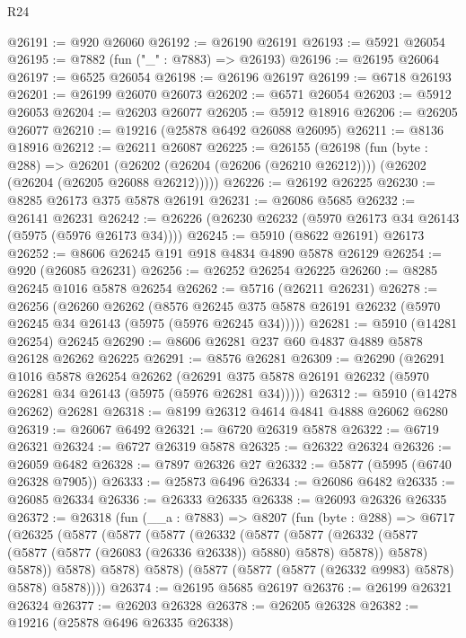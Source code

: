 \begin{lexlean}{R24}
\begin{coremodule}
@26191 := @920 @26060
@26192 := @26190 @26191
@26193 := @5921 @26054
@26195 := @7882 (fun ("_" : @7883) => @26193)
@26196 := @26195 @26064
@26197 := @6525 @26054
@26198 := @26196 @26197
@26199 := @6718 @26193
@26201 := @26199 @26070 @26073
@26202 := @6571 @26054
@26203 := @5912 @26053
@26204 := @26203 @26077
@26205 := @5912 @18916
@26206 := @26205 @26077
@26210 := @19216 (@25878 @6492 @26088 @26095)
@26211 := @8136 @18916
@26212 := @26211 @26087
@26225 := @26155
    (@26198
      (fun (byte : @288) =>
      @26201 (@26202 (@26204 (@26206 (@26210 @26212)))) (@26202 (@26204 (@26205 @26088 @26212)))))
@26226 := @26192 @26225
@26230 := @8285 @26173 @375 @5878 @26191
@26231 := @26086 @5685
@26232 := @26141 @26231
@26242 := @26226 (@26230 @26232 (@5970 @26173 @34 @26143 (@5975 (@5976 @26173 @34))))
@26245 := @5910 (@8622 @26191) @26173
@26252 := @8606 @26245 @191 @918 @4834 @4890 @5878 @26129
@26254 := @920 (@26085 @26231)
@26256 := @26252 @26254 @26225
@26260 := @8285 @26245 @1016 @5878 @26254
@26262 := @5716 (@26211 @26231)
@26278 := @26256
    (@26260
      @26262
      (@8576 @26245 @375 @5878 @26191 @26232 (@5970 @26245 @34 @26143 (@5975 (@5976 @26245 @34)))))
@26281 := @5910 (@14281 @26254) @26245
@26290 := @8606 @26281 @237 @60 @4837 @4889 @5878 @26128 @26262 @26225
@26291 := @8576 @26281
@26309 := @26290
    (@26291
      @1016
      @5878
      @26254
      @26262
      (@26291 @375 @5878 @26191 @26232 (@5970 @26281 @34 @26143 (@5975 (@5976 @26281 @34)))))
@26312 := @5910 (@14278 @26262) @26281
@26318 := @8199 @26312 @4614 @4841 @4888 @26062 @6280
@26319 := @26067 @6492
@26321 := @6720 @26319 @5878
@26322 := @6719 @26321
@26324 := @6727 @26319 @5878
@26325 := @26322 @26324
@26326 := @26059 @6482
@26328 := @7897 @26326 @27
@26332 := @5877 (@5995 (@6740 @26328 @7905))
@26333 := @25873 @6496
@26334 := @26086 @6482
@26335 := @26085 @26334
@26336 := @26333 @26335
@26338 := @26093 @26326 @26335
@26372 := @26318
    (fun (__a : @7883) =>
    @8207
      (fun (byte : @288) =>
      @6717
        (@26325
          (@5877
            (@5877
              (@5877
                (@26332
                  (@5877
                    (@5877
                      (@26332 (@5877 (@5877 (@5877 (@26083 (@26336 @26338)) @5880) @5878) @5878))
                      @5878)
                    @5878))
                @5878)
              @5878)
            @5878)
          (@5877 (@5877 (@5877 (@26332 @9983) @5878) @5878) @5878))))
@26374 := @26195 @5685 @26197
@26376 := @26199 @26321 @26324
@26377 := @26203 @26328
@26378 := @26205 @26328
@26382 := @19216 (@25878 @6496 @26335 @26338)

\end{coremodule}
\end{lexlean}
